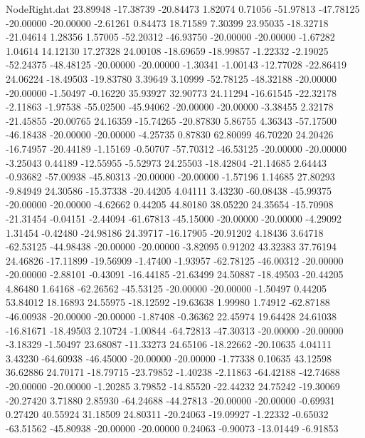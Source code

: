 \begin{filecontents}{NodeRight.dat}
  23.89948  -17.38739  -20.84473     1.82074    0.71056  -51.97813  -47.78125  -20.00000  -20.00000   -2.61261    0.84473   18.71589    7.30399
  23.95035  -18.32718  -21.04614     1.28356    1.57005  -52.20312  -46.93750  -20.00000  -20.00000   -1.67282    1.04614   14.12130   17.27328
  24.00108  -18.69659  -18.99857    -1.22332   -2.19025  -52.24375  -48.48125  -20.00000  -20.00000   -1.30341   -1.00143  -12.77028  -22.86419
  24.06224  -18.49503  -19.83780     3.39649    3.10999  -52.78125  -48.32188  -20.00000  -20.00000   -1.50497   -0.16220   35.93927   32.90773
  24.11294  -16.61545  -22.32178    -2.11863   -1.97538  -55.02500  -45.94062  -20.00000  -20.00000   -3.38455    2.32178  -21.45855  -20.00765
  24.16359  -15.74265  -20.87830     5.86755    4.36343  -57.17500  -46.18438  -20.00000  -20.00000   -4.25735    0.87830   62.80099   46.70220
  24.20426  -16.74957  -20.44189    -1.15169   -0.50707  -57.70312  -46.53125  -20.00000  -20.00000   -3.25043    0.44189  -12.55955   -5.52973
  24.25503  -18.42804  -21.14685     2.64443   -0.93682  -57.00938  -45.80313  -20.00000  -20.00000   -1.57196    1.14685   27.80293   -9.84949
  24.30586  -15.37338  -20.44205     4.04111    3.43230  -60.08438  -45.99375  -20.00000  -20.00000   -4.62662    0.44205   44.80180   38.05220
  24.35654  -15.70908  -21.31454    -0.04151   -2.44094  -61.67813  -45.15000  -20.00000  -20.00000   -4.29092    1.31454   -0.42480  -24.98186
  24.39717  -16.17905  -20.91202     4.18436    3.64718  -62.53125  -44.98438  -20.00000  -20.00000   -3.82095    0.91202   43.32383   37.76194
  24.46826  -17.11899  -19.56909    -1.47400   -1.93957  -62.78125  -46.00312  -20.00000  -20.00000   -2.88101   -0.43091  -16.44185  -21.63499
  24.50887  -18.49503  -20.44205     4.86480    1.64168  -62.26562  -45.53125  -20.00000  -20.00000   -1.50497    0.44205   53.84012   18.16893
  24.55975  -18.12592  -19.63638     1.99980    1.74912  -62.87188  -46.00938  -20.00000  -20.00000   -1.87408   -0.36362   22.45974   19.64428
  24.61038  -16.81671  -18.49503     2.10724   -1.00844  -64.72813  -47.30313  -20.00000  -20.00000   -3.18329   -1.50497   23.68087  -11.33273
  24.65106  -18.22662  -20.10635     4.04111    3.43230  -64.60938  -46.45000  -20.00000  -20.00000   -1.77338    0.10635   43.12598   36.62886
  24.70171  -18.79715  -23.79852    -1.40238   -2.11863  -64.42188  -42.74688  -20.00000  -20.00000   -1.20285    3.79852  -14.85520  -22.44232
  24.75242  -19.30069  -20.27420     3.71880    2.85930  -64.24688  -44.27813  -20.00000  -20.00000   -0.69931    0.27420   40.55924   31.18509
  24.80311  -20.24063  -19.09927    -1.22332   -0.65032  -63.51562  -45.80938  -20.00000  -20.00000    0.24063   -0.90073  -13.01449   -6.91853

\end{filecontents}
